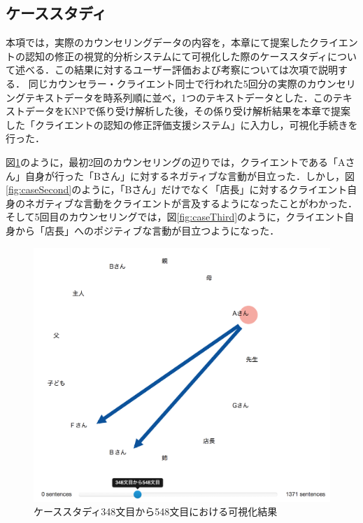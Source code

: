 \documentclass[shuuron]{kuee}
\begin{document}
\subsection{ケーススタディ} %

本項では，実際のカウンセリングデータの内容を，本章にて提案したクライエントの認知の修正の視覚的分析システムにて可視化した際のケーススタディについて述べる．この結果に対するユーザー評価および考察については次項で説明する．
同じカウンセラー・クライエント同士で行われた5回分の実際のカウンセリングテキストデータを時系列順に並べ，1つのテキストデータとした．このテキストデータをKNPで係り受け解析した後，その係り受け解析結果を本章で提案した「クライエントの認知の修正評価支援システム」に入力し，可視化手続きを行った．

図\ref{fig:caseFirst}のように，最初2回のカウンセリングの辺りでは，クライエントである「Aさん」自身が行った「Bさん」に対するネガティブな言動が目立った．しかし，図\ref{fig:caseSecond}のように，「Bさん」だけでなく「店長」に対するクライエント自身のネガティブな言動をクライエントが言及するようになったことがわかった．そして5回目のカウンセリングでは，図\ref{fig:caseThird}のように，クライエント自身から「店長」へのポジティブな言動が目立つようになった．


\begin{figure}
  \begin{center}
    \includegraphics[width=\linewidth]{caseFirst.png}
  \end{center}
  \caption{ケーススタディ348文目から548文目における可視化結果}
  \label{fig:caseFirst}
\end{figure}
\end{document}
